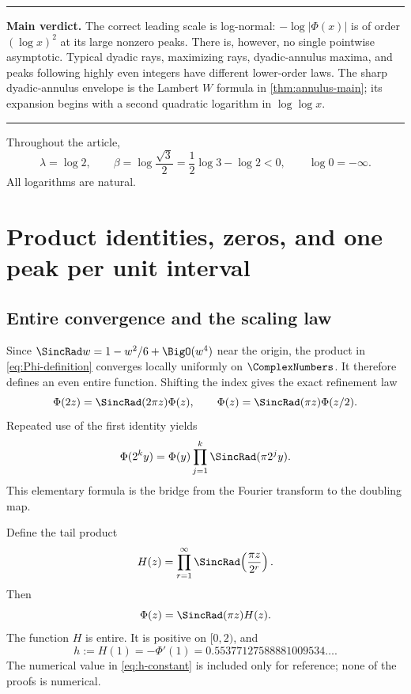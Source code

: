 \documentclass[11pt,oneside]{article}
\theoremstyle{definition}
\theoremstyle{remark}
\newcommand{\PhiF}{\Phi}
\newenvironment{boxedremark}{%
  \par\smallskip\noindent\begin{center}\begin{minipage}{0.94\textwidth}%
  \color{black}\hrule\vspace{0.6em}\small
}{%
  \vspace{0.6em}\hrule\end{minipage}\end{center}\smallskip
}
\begin{document}
\begin{boxedremark}
\textbf{Main verdict.}
The correct leading scale is log-normal:
\(-\log|\PhiF(x)|\) is of order \((\log x)^2\) at its large nonzero peaks.
There is, however, no single pointwise asymptotic.  Typical dyadic rays,
maximizing rays, dyadic-annulus maxima, and peaks following highly even
integers have different lower-order laws.  The sharp dyadic-annulus envelope
is the Lambert \(W\) formula in \cref{thm:annulus-main}; its expansion begins
with a second quadratic logarithm in \(\log\log x\).
\end{boxedremark}

Throughout the article,
\begin{equation}
 \lambda=\log2,
 \qquad
 \beta=\log\frac{\sqrt3}{2}=\frac12\log3-\log2<0,
 \qquad
 \log0=-\infty.
 \label{eq:constants-lambda-beta}
\end{equation}
All logarithms are natural.

\section{Product identities, zeros, and one peak per unit interval}
\label{sec:basic}

\subsection{Entire convergence and the scaling law}

Since
\(
 \SincRad w=1-w^2/6+\BigO(w^4)
\)
near the origin, the product in \eqref{eq:Phi-definition} converges locally
uniformly on \(\ComplexNumbers\).  It therefore defines an even entire function.  Shifting
the index gives the exact refinement law
\begin{equation}
 \PhiF(2z)=\SincRad(2\pi z)\PhiF(z),
 \qquad
 \PhiF(z)=\SincRad(\pi z)\PhiF(z/2).
 \label{eq:Phi-scaling}
\end{equation}
Repeated use of the first identity yields
\begin{equation}
 \PhiF(2^k y)=\PhiF(y)
 \prod_{j=1}^{k}\SincRad(\pi2^j y).
 \label{eq:Phi-ray-product}
\end{equation}
This elementary formula is the bridge from the Fourier transform to the
doubling map.

Define the tail product
\begin{equation}
 H(z)=\prod_{r=1}^{\infty}
 \SincRad\!\left(\frac{\pi z}{2^r}\right).
 \label{eq:H-definition}
\end{equation}
Then
\begin{equation}
 \PhiF(z)=\SincRad(\pi z)H(z).
 \label{eq:Phi-H}
\end{equation}
The function \(H\) is entire.  It is positive on \([0,2)\), and
\begin{equation}
 h:=H(1)=-\PhiF'(1)
 =0.55377127588881009534\ldots.
 \label{eq:h-constant}
\end{equation}
The numerical value in \eqref{eq:h-constant} is included only for reference;
none of the proofs is numerical.
\end{document}
